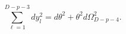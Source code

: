 \begin{equation}
\sum_{\ell=1}^{D-p-3}
d y^{2}_{l}= d\theta^{2} +\theta^{2}d \Omega^{2}_{D-p-4}.
\end{equation}


